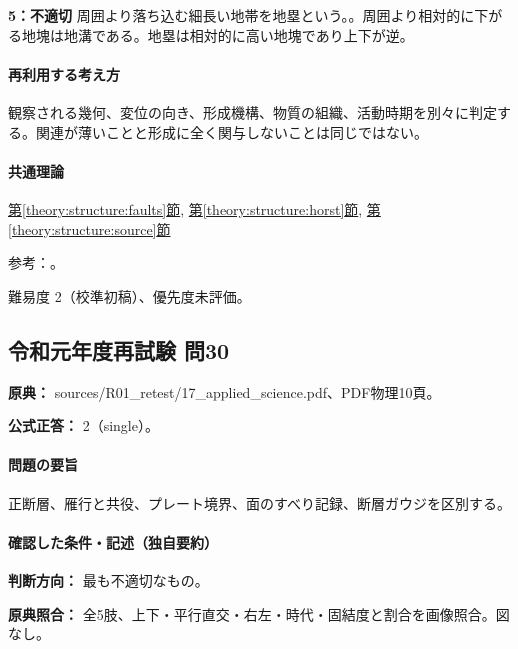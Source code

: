 \noindent\textbf{5：不適切} 周囲より落ち込む細長い地帯を地塁という。。周囲より相対的に下がる地塊は地溝である。地塁は相対的に高い地塊であり上下が逆。\par

\paragraph{再利用する考え方} 観察される幾何、変位の向き、形成機構、物質の組織、活動時期を別々に判定する。関連が薄いことと形成に全く関与しないことは同じではない。

\paragraph{共通理論} \hyperref[theory:structure:faults]{第\ref*{theory:structure:faults}節}, \hyperref[theory:structure:horst]{第\ref*{theory:structure:horst}節}, \hyperref[theory:structure:source]{第\ref*{theory:structure:source}節}

\par 参考：\cite{str_source}。

\par 難易度 2（校準初稿）、優先度未評価。

\subsection{令和元年度再試験 問30}
\label{q:r01-ret-applied-30}

\noindent\textbf{原典：} sources/R01\_retest/17\_applied\_science.pdf、PDF物理10頁。

\textbf{公式正答：} 2（single）。

\paragraph{問題の要旨} 正断層、雁行と共役、プレート境界、面のすべり記録、断層ガウジを区別する。

\paragraph{確認した条件・記述（独自要約）}\mbox{}\par

\noindent\textbf{判断方向：} 最も不適切なもの。\par

\noindent\textbf{原典照合：} 全5肢、上下・平行直交・右左・時代・固結度と割合を画像照合。図なし。\par

